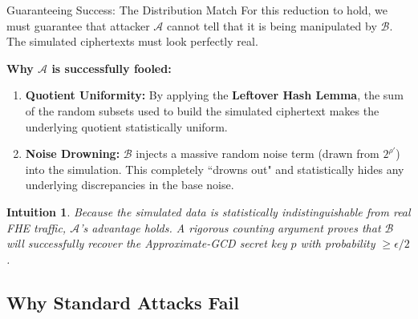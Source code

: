 \documentclass[10pt]{beamer}
\newtheorem{intuition}{Intuition}
\begin{document}
\begin{frame}{Guaranteeing Success: The Distribution Match}
    For this reduction to hold, we must guarantee that attacker $\mathcal{A}$ cannot tell that it is being manipulated by $\mathcal{B}$. The simulated ciphertexts must look perfectly real.
    \pause
    
    \vspace{0.3cm}
    \textbf{Why $\mathcal{A}$ is successfully fooled:}
    \begin{enumerate}
        \item \textbf{Quotient Uniformity:} By applying the \textbf{Leftover Hash Lemma}, the sum of the random subsets used to build the simulated ciphertext makes the underlying quotient statistically uniform.
        \pause
        \item \textbf{Noise Drowning:} $\mathcal{B}$ injects a massive random noise term (drawn from $2^{\rho'}$) into the simulation. This completely ``drowns out" and statistically hides any underlying discrepancies in the base noise.
    \end{enumerate}
    \pause
    
    \vspace{0.3cm}
    \begin{intuition}
    Because the simulated data is statistically indistinguishable from real FHE traffic, $\mathcal{A}$'s advantage holds. A rigorous counting argument proves that $\mathcal{B}$ will successfully recover the Approximate-GCD secret key $p$ with probability $\ge \epsilon/2$.
    \end{intuition}
\end{frame}

\subsection{Why Standard Attacks Fail}
\end{document}
